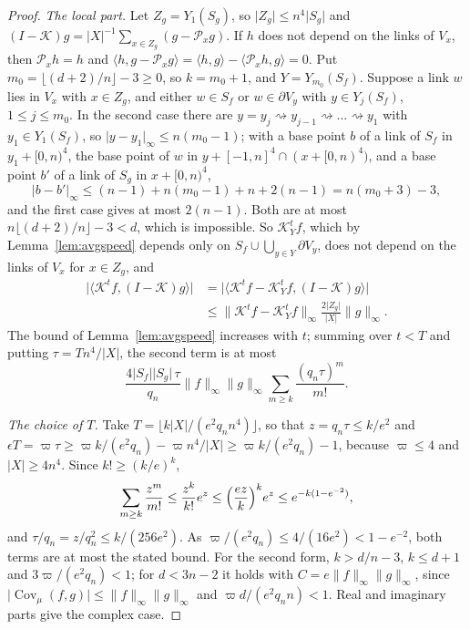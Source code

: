 \documentclass[aps,prd,twocolumn,superscriptaddress,nofootinbib,longbibliography,floatfix,amsmath,amssymb,10pt]{revtex4-2}
\theoremstyle{definition}
\theoremstyle{remark}
\newcommand{\Cov}{\operatorname{Cov}}
\newcommand{\ip}[2]{\langle #1,#2\rangle}
\begin{document}
\begin{proof}
\emph{The local part.} Let $Z_g=Y_1(S_g)$, so $\lvert Z_g\rvert\le n^4\lvert
S_g\rvert$ and $(I-\mathcal K)g=\lvert X\rvert^{-1}\sum_{x\in Z_g}(g-
\mathcal P_xg)$. If $h$ does not depend on the links of $V_x$, then $\mathcal
P_xh=h$ and $\ip h{g-\mathcal P_xg}=\ip hg-\ip{\mathcal P_xh}g=0$. Put $m_0=
\lfloor(d+2)/n\rfloor-3\ge0$, so $k=m_0+1$, and $Y=Y_{m_0}(S_f)$. Suppose a
link $w$ lies in $V_x$ with $x\in Z_g$, and either $w\in S_f$ or $w\in
\partial V_y$ with $y\in Y_j(S_f)$, $1\le j\le m_0$. In the second case there
are $y=y_j\rightsquigarrow y_{j-1}\rightsquigarrow\dots\rightsquigarrow y_1$
with $y_1\in Y_1(S_f)$, so $\lvert y-y_1\rvert_\infty\le n(m_0-1)$; with a
base point $b$ of a link of $S_f$ in $y_1+[0,n)^4$, the base point of $w$
in $y+[-1,n]^4\cap(x+[0,n)^4)$, and a base point $b'$ of a link of $S_g$ in
$x+[0,n)^4$,
\[
\lvert b-b'\rvert_\infty\le(n-1)+n(m_0-1)+n+2(n-1)=n(m_0+3)-3,
\]
and the first case gives at most $2(n-1)$. Both are at most $n\lfloor(d+2)/n
\rfloor-3<d$, which is impossible. So $\mathcal K_Y^tf$, which by
Lemma~\ref{lem:avgspeed} depends only on $S_f\cup\bigcup_{y\in Y}\partial
V_y$, does not depend on the links of $V_x$ for $x\in Z_g$, and
\[
\begin{split}
\bigl\lvert\ip{\mathcal K^tf}{(I-\mathcal K)g}\bigr\rvert&=\bigl\lvert
\ip{\mathcal K^tf-\mathcal K_Y^tf}{(I-\mathcal K)g}\bigr\rvert\\
&\le\lVert\mathcal K^tf-\mathcal K_Y^tf\rVert_\infty\frac{2\lvert Z_g
\rvert}{\lvert X\rvert}\lVert g\rVert_\infty .
\end{split}
\]
The bound of Lemma~\ref{lem:avgspeed} increases with $t$; summing over $t<T$
and putting $\tau=Tn^4/\lvert X\rvert$, the second term is at most
\[
\frac{4\lvert S_f\rvert\lvert S_g\rvert\,\tau}{q_n}\lVert f\rVert_\infty
\lVert g\rVert_\infty\sum_{m\ge k}\frac{(q_n\tau)^m}{m!} .
\]

\emph{The choice of $T$.} Take $T=\lfloor k\lvert X\rvert/(e^2q_nn^4)\rfloor$,
so that $z=q_n\tau\le k/e^2$ and $\epsilon T=\varpi\tau\ge\varpi k/(e^2q_n)-
\varpi n^4/\lvert X\rvert\ge\varpi k/(e^2q_n)-1$, because $\varpi\le4$ and
$\lvert X\rvert\ge4n^4$. Since $k!\ge(k/e)^k$,
\[
\sum_{m\ge k}\frac{z^m}{m!}\le\frac{z^k}{k!}e^z\le\Bigl(\frac{ez}k\Bigr)^k
e^z\le e^{-k(1-e^{-2})},
\]
and $\tau/q_n=z/q_n^2\le k/(256e^2)$. As $\varpi/(e^2q_n)\le4/(16e^2)<1-
e^{-2}$, both terms are at most the stated bound. For the second form, $k>
d/n-3$, $k\le d+1$ and $3\varpi/(e^2q_n)<1$; for $d<3n-2$ it holds with $C=
e\lVert f\rVert_\infty\lVert g\rVert_\infty$, since $\lvert\Cov_\mu(f,g)
\rvert\le\lVert f\rVert_\infty\lVert g\rVert_\infty$ and $\varpi d/(e^2q_nn)
<1$. Real and imaginary parts give the complex case.
\end{proof}
\end{document}
